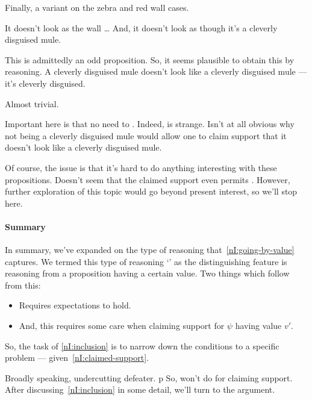 \begin{note}
  Finally, a variant on the zebra and red wall cases.

  It doesn't look as the wall \dots
  And, it doesn't look as though it's a cleverly disguised mule.

  This is admittedly an odd proposition.
  So, it seems plausible to obtain this by reasoning.
  A cleverly disguised mule doesn't look like a cleverly disguised mule --- it's cleverly disguised.

  Almost trivial.

  Important here is that no need to \RBV{}.
  Indeed, \RBV{} is strange.
  Isn't at all obvious why not being a cleverly disguised mule would allow one to claim support that it doesn't look like a cleverly disguised mule.

  Of course, the issue is that it's hard to do anything interesting with these propositions.
  Doesn't seem that the claimed support even permits \RBV{}.
  However, further exploration of this topic would go beyond present interest, so we'll stop here.
\end{note}




\paragraph*{Summary}

\begin{note}[Summary]
  In summary, we've expanded on the type of reasoning that~\ref{nI:going-by-value} captures.
  We termed this type of reasoning `\RBV{-}' as the distinguishing feature is reasoning from a proposition having a certain value.
  Two things which follow from this:
  \begin{itemize}
  \item Requires expectations to hold.
  \item And, this requires some care when claiming support for \(\psi\) having value \(v'\).
  \end{itemize}
  So, the task of \ref{nI:inclusion} is to narrow down the conditions to a specific problem --- given~\ref{nI:claimed-support}.

  Broadly speaking, {\color{red} undercutting defeater}.
p  So, \RBV{} won't do for claiming support.
  After discussing~\ref{nI:inclusion} in some detail, we'll turn to the argument.
\end{note}